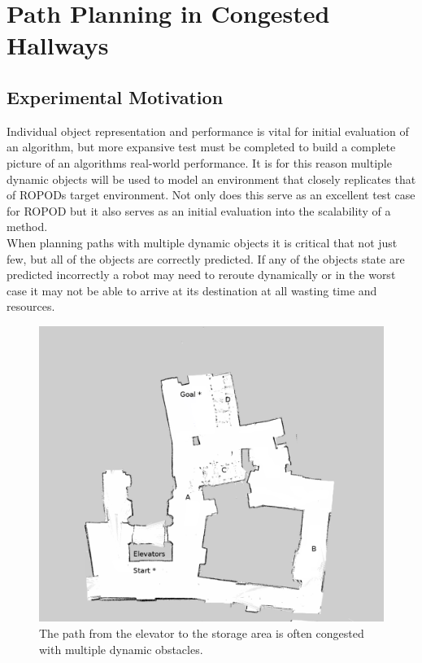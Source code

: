   \clearpage
  \section{ Path Planning in Congested Hallways}

  \subsection{ Experimental Motivation }

  Individual object representation and performance is vital for initial
  evaluation of an algorithm, but more expansive test must be completed to
  build a complete picture of an algorithms real-world performance. It is for
  this reason multiple dynamic objects will be used to model an environment
  that closely replicates that of ROPODs target environment. Not only does this
  serve as an excellent test case for ROPOD but it also serves as an initial
  evaluation into the scalability of a method. \\

  When planning paths with multiple dynamic objects it is critical that not just
  few, but all of the objects are correctly predicted. If any of the objects state are
  predicted incorrectly a robot may need to reroute dynamically or in the worst
  case it may not be able to arrive at its destination at all wasting time and
  resources.


  \begin{figure}[!htb]
    \centering
    \includegraphics[width=\linewidth]{images/basement_congestion.png}
    \caption{The path from the elevator to the storage area is often congested with multiple dynamic obstacles. }
    \label{figure:basement_congestion}
  \end{figure}

